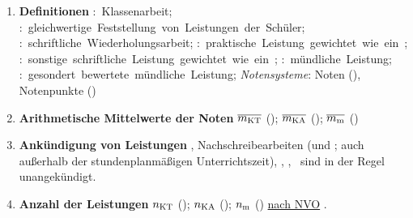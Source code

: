 \begin{enumerate}[label=\textbf{(\arabic*)}, align=left, leftmargin=*]
	\item \textbf{Definitionen} { \thisfontsize \mbox{\textbf{}: Klassenarbeit}; \mbox{\textbf{}: gleichwertige Feststellung von Leistungen der Schüler}; \mbox{\textbf{}: schriftliche Wiederholungsarbeit};  \linebreak \mbox{\textbf{}: praktische Leistung gewichtet wie ein }; \mbox{\textbf{}: sonstige schriftliche Leistung gewichtet wie ein };   \linebreak \mbox{\textbf{}: mündliche Leistung}; \mbox{\textbf{}: gesondert bewertete mündliche Leistung}; \textit{Notensysteme}: Noten (\textbf{}), Notenpunkte (\textbf{}) }
	
	\item \textbf{Arithmetische Mittelwerte der Noten}  { \thisfontsize $\overline{m_{\mathrm{KT}}}$ (\catkt); $\overline{m_{\mathrm{KA}}}$ (\catka); $\overline{m_{\mathrm{m}}}$ (\catm) }
	
	
	\item \textbf{Ankündigung von Leistungen} { \thisfontsize {}, Nachschreibearbeiten ( und \catka; auch außerhalb der stundenplanmäßigen Unterrichtszeit), , , \catm~sind in der Regel unangekündigt.}
	\item \textbf{Anzahl der Leistungen} { \thisfontsize $n_{\mathrm{KT}}$ (\catkt); $n_{\mathrm{KA}}$ (\catka); $n_{\mathrm{m}}$ (\catm) \href{\nvourl}{nach NVO} \cite{nvo}}.
	

\end{enumerate}
